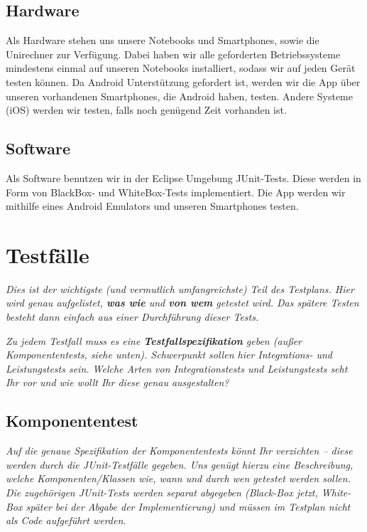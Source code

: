 \documentclass[fontsize=12pt,paper=a4,twoside]{scrartcl}
\begin{document}
\subsection{Hardware}

Als Hardware stehen uns unsere Notebooks und Smartphones, sowie die Unirechner zur Verfügung. Dabei haben wir alle geforderten Betriebssysteme mindestens einmal auf unseren Notebooks installiert, sodass wir auf jeden Gerät testen können. Da Android Unterstützung gefordert ist, werden wir die App über unseren vorhandenen Smartphones, die Android haben, testen. Andere Systeme (iOS) werden wir testen, falls noch genügend Zeit vorhanden ist.

\subsection{Software}

Als Software benutzen wir in der Eclipse Umgebung JUnit-Tests. Diese werden in Form von BlackBox- und WhiteBox-Tests implementiert. Die App werden wir mithilfe eines Android Emulators und unseren Smartphones testen.

\section{Testfälle}\label{c10}

{\em Dies ist der wichtigste (und vermutlich umfangreichste) Teil des
  Testplans. Hier wird genau aufgelistet, {\bf was wie} und {\bf von
  wem} getestet wird. Das spätere Testen besteht dann einfach aus
  einer Durchführung dieser Tests.}

{\em Zu jedem Testfall muss es eine {\bf Testfallspezifikation}
  geben (außer Komponententests, siehe unten). Schwerpunkt sollen
  hier Integrations- und Leistungstests sein. Welche Arten von
  Integrationstests und Leistungstests seht Ihr vor und wie wollt Ihr
  diese genau ausgestalten?}

\subsection{Komponententest}\label{c10-0}

{\em Auf die genaue Spezifikation der Komponententests könnt Ihr
  verzichten -- diese werden durch die JUnit-Testfälle gegeben. Uns
  genügt hierzu eine Beschreibung, welche Komponenten/Klassen wie,
  wann und durch wen getestet werden sollen. Die zugehörigen
  JUnit-Tests werden separat abgegeben (Black-Box jetzt, White-Box
  später bei der Abgabe der Implementierung) und müssen im Testplan
  nicht als Code aufgeführt werden.}
\end{document}
